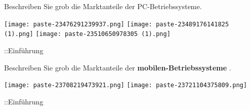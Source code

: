 \documentclass{article}
\begin{document}
\begin{tcolorbox}[colback=white!10!white,colframe=lightgray!75!black,
  savelowerto=\jobname_ex.tex]

\begin{center}
Beschreiben Sie grob die Marktanteile der PC-Betriebssysteme.

\end{center}

\tcblower

\justifying
\texttt{[image: paste-23476291239937.png]}
\texttt{[image: paste-23489176141825 (1).png]}
\texttt{[image: paste-23510650978305 (1).png]}

\end{tcolorbox}
\begin{tcolorbox}[colback=white!10!white,colframe=lightgray!75!black,
  savelowerto=\jobname_ex.tex]

\begin{center}
::Einführung

\end{center}

\tcblower

\justifying

\end{tcolorbox}
\begin{tcolorbox}[colback=white!10!white,colframe=lightgray!75!black,
  savelowerto=\jobname_ex.tex]

\begin{center}
Beschreiben Sie grob die Marktanteile der 
\textbf{mobilen-Betriebssysteme
}.

\end{center}

\tcblower

\justifying
\texttt{[image: paste-23708219473921.png]}
\texttt{[image: paste-23721104375809.png]}

\end{tcolorbox}
\begin{tcolorbox}[colback=white!10!white,colframe=lightgray!75!black,
  savelowerto=\jobname_ex.tex]

\begin{center}
::Einführung

\end{center}

\tcblower

\justifying

\end{tcolorbox}
\end{document}
